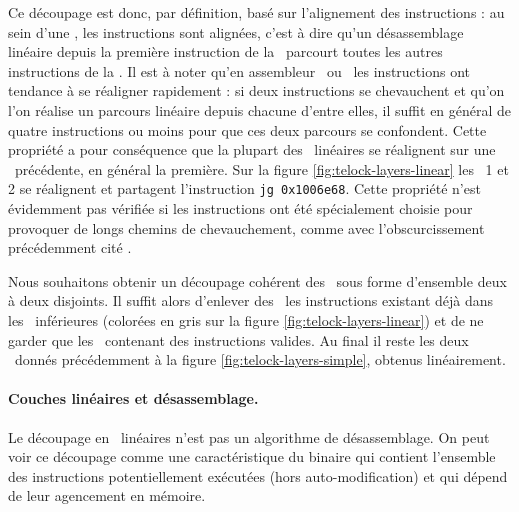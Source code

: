 Ce découpage est donc, par définition, basé sur l'alignement des instructions : au sein d'une \layer, les instructions sont alignées, c'est à dire qu'un désassemblage linéaire depuis la première instruction de la \layer\ parcourt toutes les autres instructions de la \layer. 
Il est à noter qu'en assembleur \xq\ ou \xs\ les instructions ont tendance à se réaligner rapidement : si deux instructions se chevauchent et qu'on l'on réalise un parcours linéaire depuis chacune d'entre elles, il suffit en général de quatre instructions ou moins pour que ces deux parcours se confondent.
Cette propriété a pour conséquence que la plupart des \layers\ linéaires se réalignent sur une \layer\ précédente, en général la première. Sur la figure \ref{fig:telock-layers-linear} les \layers\ 1 et 2 se réalignent et partagent l'instruction \texttt{jg 0x1006e68}.
Cette propriété n'est évidemment pas vérifiée si les instructions ont été spécialement choisie pour provoquer de longs chemins de chevauchement, comme avec l'obscurcissement précédemment cité \cite{JLH13}.

Nous souhaitons obtenir un découpage cohérent des \layers\ sous forme d'ensemble deux à deux disjoints.
Il suffit alors d'enlever des \layers\ les instructions existant déjà dans les \layers\ inférieures (colorées en gris sur la figure \ref{fig:telock-layers-linear}) et de ne garder que les \layers\ contenant des instructions valides.
Au final il reste les deux \layers\ donnés précédemment à la figure \ref{fig:telock-layers-simple}, obtenus linéairement.


\paragraph{Couches linéaires et désassemblage.}
Le découpage en \layers\ linéaires n'est pas un algorithme de désassemblage.
On peut voir ce découpage comme une caractéristique du binaire qui contient l'ensemble des instructions potentiellement exécutées (hors auto-modification) et qui dépend de leur agencement en mémoire.


